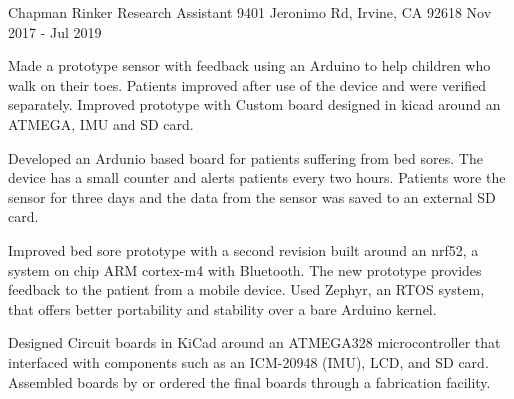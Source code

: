 \begin{cventries}
  \cventry
    {Chapman Rinker} %
    {Research Assistant} %
    {9401 Jeronimo Rd, Irvine, CA 92618} %
    {Nov 2017 - Jul 2019} %
    {
      \begin{cvitems} %
      \item{Made a prototype sensor with feedback using an Arduino to help children who walk on their toes. Patients improved after use of the device and were verified separately. Improved prototype with Custom board designed in kicad around an ATMEGA, IMU and SD card.  }
      \item{Developed an Ardunio based board for patients suffering from bed sores. The device has a small counter and alerts patients every two hours. Patients wore the sensor for three days and the data from the sensor was saved to an external SD card.}
      \item{Improved bed sore prototype with a second revision built around an nrf52, a system on chip ARM cortex-m4 with Bluetooth. The new prototype provides feedback to the patient from a mobile device. Used Zephyr, an RTOS system, that offers better portability and stability over a bare Arduino kernel.}
      \item{Designed Circuit boards in KiCad around an ATMEGA328 microcontroller that interfaced with components such as an  ICM-20948 (IMU), LCD, and SD card. Assembled boards by or ordered the final boards through a fabrication facility.}
      \end{cvitems}
    }


\end{cventries}
